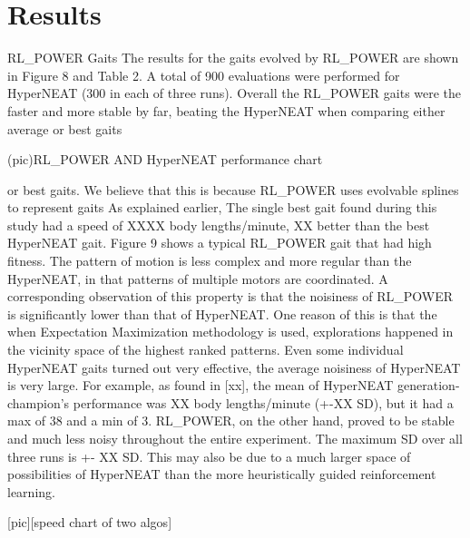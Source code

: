 \section{Results}

RL_POWER Gaits
The results for the gaits evolved by RL_POWER are shown
in Figure 8 and Table 2. A total of 900 evaluations were performed for HyperNEAT (300 in each of three runs). Overall the RL_POWER gaits were the faster and more stable by far, beating the HyperNEAT when comparing either average or best gaits

(pic)RL_POWER AND HyperNEAT performance chart


or best gaits. We believe that this is because RL_POWER uses evolvable splines to represent gaits As explained earlier,  
The single best gait found during this study had a speed of
XXXX body lengths/minute, XX%
better than the best HyperNEAT gait. Figure 9 shows a typical RL_POWER gait that had high fitness. The pattern of motion is less complex and more regular than the HyperNEAT, in that patterns of multiple motors are coordinated.
A corresponding observation of this property is that the noisiness of RL_POWER is significantly lower than that of HyperNEAT. One reason of this is that the when Expectation Maximization methodology is used, explorations happened in the vicinity space of the highest ranked patterns. Even some individual HyperNEAT gaits turned out very effective, the average noisiness of HyperNEAT is very large. For example, as found in [xx], the mean of HyperNEAT generation-champion’s performance was XX body lengths/minute (+-XX SD), but it had a max of 38 and a min of 3. RL_POWER, on the other hand,  proved to be stable and much less noisy throughout the entire experiment. The maximum SD over all three runs is +- XX SD. This may also be due to a much larger space of possibilities of HyperNEAT than the more heuristically guided reinforcement learning.

[pic][speed chart of two algos]


